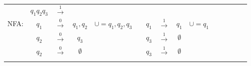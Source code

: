 \documentclass[
	final,
	a4paper,
	oneside,
	parskip=full,
	headings=standardclasses,
	headings=big,
	pointednumbers
]{scrartcl}
\begin{document}
\begin{tabular}{l|ccc|ll|ccc|ll|ccc|l}
            \multicolumn{1}{c}{}     & $q_1q_2q_3$ & $\xrightarrow{1}$ & \multicolumn{1}{c}{} & & 
            \multicolumn{4}{c}{}     &
        \\  
            \cline{2-4} \cline{7-9}
            \multirow{3}{*}{NFA:}    & $q_1$    & $\xrightarrow{0}$ & $q_1,q_2$   & \multirow{3}{*}{$\cup = q_1,q_2,q_3$} &
            \multirow{3}{*}{}        & $q_1$    & $\xrightarrow{1}$ & $q_1$       & \multirow{3}{*}{$\cup = q_1$} &
            \multicolumn{4}{c}{}     &
        \\
                                     & $q_2$    & $\xrightarrow{0}$ & $q_3$       & &
                                     & $q_3$    & $\xrightarrow{1}$ & $\emptyset$ & &
            \multicolumn{4}{c}{}     &
        \\
                                     & $q_2$    & $\xrightarrow{0}$ & $\emptyset$ & &
                                     & $q_3$    & $\xrightarrow{1}$ & $\emptyset$ & &
            \multicolumn{4}{c}{}     &
        \\
            \cline{2-4} \cline{7-9}
            \multicolumn{1}{c}{} & & & \multicolumn{1}{c}{} & &
            \multicolumn{1}{c}{} & & & \multicolumn{1}{c}{} & &
            \multicolumn{1}{c}{} & & & \multicolumn{1}{c}{} &
        \\
            
    \end{tabular}
    
\end{document}
